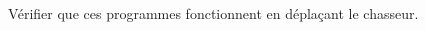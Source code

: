 \begin{changemargin}{-15mm}{-15mm}
\begin{enigme}
\begin{enumerate}
 
       Vérifier que ces programmes fonctionnent en déplaçant le chasseur.
 


\end{enumerate}
\end{enigme}
\end{changemargin}
